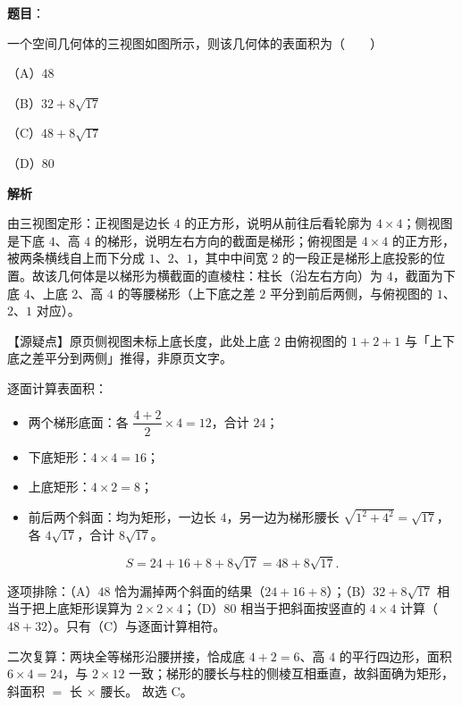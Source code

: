 \begin{answer}

\textbf{题目}：

一个空间几何体的三视图如图所示，则该几何体的表面积为\mbox{（　　）}

（A）$48$

（B）$32+8\sqrt{17}$

（C）$48+8\sqrt{17}$

（D）$80$
\nopagebreak[4]
\begin{center}\end{center}
\nopagebreak[4]
\textbf{解析}

由三视图定形：正视图是边长 $4$ 的正方形，说明从前往后看轮廓为 $4\times4$；侧视图是下底 $4$、高 $4$ 的梯形，说明左右方向的截面是梯形；俯视图是 $4\times4$ 的正方形，被两条横线自上而下分成 $1$、$2$、$1$，其中中间宽 $2$ 的一段正是梯形上底投影的位置。故该几何体是以梯形为横截面的直棱柱：柱长（沿左右方向）为 $4$，截面为下底 $4$、上底 $2$、高 $4$ 的等腰梯形（上下底之差 $2$ 平分到前后两侧，与俯视图的 $1$、$2$、$1$ 对应）。

【源疑点】原页侧视图未标上底长度，此处上底 $2$ 由俯视图的 $1+2+1$ 与「上下底之差平分到两侧」推得，非原页文字。

逐面计算表面积：

\begin{itemize}
\item 两个梯形底面：各 $\dfrac{4+2}{2}\times4=12$，合计 $24$；
\item 下底矩形：$4\times4=16$；
\item 上底矩形：$4\times2=8$；
\item 前后两个斜面：均为矩形，一边长 $4$，另一边为梯形腰长 $\sqrt{1^2+4^2}=\sqrt{17}$，各 $4\sqrt{17}$，合计 $8\sqrt{17}$。
\end{itemize}

\nopagebreak[4]
\[S=24+16+8+8\sqrt{17}=48+8\sqrt{17}.\]

逐项排除：（A）$48$ 恰为漏掉两个斜面的结果（$24+16+8$）；（B）$32+8\sqrt{17}$ 相当于把上底矩形误算为 $2\times2\times4$；（D）$80$ 相当于把斜面按竖直的 $4\times4$ 计算（$48+32$）。只有（C）与逐面计算相符。

二次复算：两块全等梯形沿腰拼接，恰成底 $4+2=6$、高 $4$ 的平行四边形，面积 $6\times4=24$，与 $2\times12$ 一致；梯形的腰长与柱的侧棱互相垂直，故斜面确为矩形，斜面积 $=$ 长 $\times$ 腰长。
故选 C。


\end{answer}
